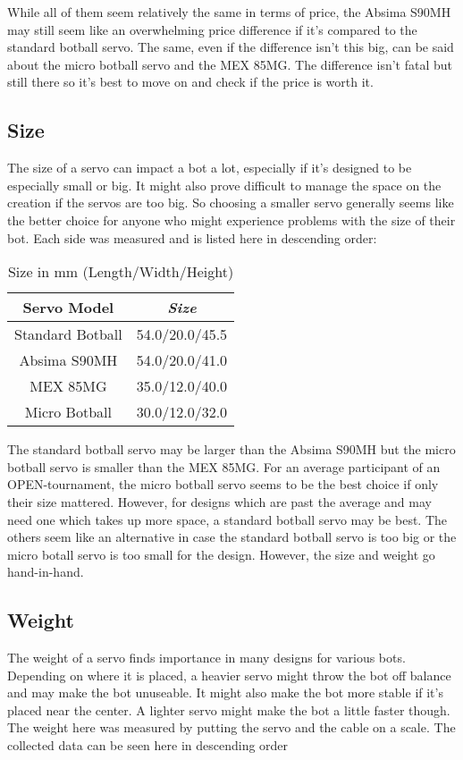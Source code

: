 \documentclass[conference]{IEEEtran}
\begin{document}
While all of them seem relatively the same in terms of price, the Absima S90MH may still seem like an overwhelming price difference if it's compared to the standard botball servo. The same, even if the difference isn't this big, can be said about the micro botball servo and the MEX 85MG. The difference isn't fatal but still there so it's best to move on and check if the price is worth it.

\subsection{Size}
The size of a servo can impact a bot a lot, especially if it's designed to be especially small or big. It might also prove difficult to manage the space on the creation if the servos are too big. So choosing a smaller servo generally seems like the better choice for anyone who might experience problems with the size of their bot. Each side was measured and is listed here in descending order:

\begin{table}[htbp]
\caption{Size in mm (Length/Width/Height)}
\begin{center}
\begin{tabular}{|c|c|}
\hline
\textbf{Servo Model} & \textbf{\textit{Size}} \\
\hline
Standard Botball & 54.0/20.0/45.5 \\
Absima S90MH & 54.0/20.0/41.0 \\
MEX 85MG & 35.0/12.0/40.0 \\
Micro Botball & 30.0/12.0/32.0 \\
\hline
\end{tabular}
\label{tab2}
\end{center}
\end{table}

The standard botball servo may be larger than the Absima S90MH but the micro botball servo is smaller than the MEX 85MG. For an average participant of an OPEN-tournament, the micro botball servo seems to be the best choice if only their size mattered. However, for designs which are past the average and may need one which takes up more space, a standard botball servo may be best. The others seem like an alternative in case the standard botball servo is too big or the micro botall servo is too small for the design. However, the size and weight go hand-in-hand.

\subsection{Weight}
The weight of a servo finds importance in many designs for various bots. Depending on where it is placed, a heavier servo might throw the bot off balance and may make the bot unuseable. It might also make the bot more stable if it's placed near the center. A lighter servo might make the bot a little faster though. The weight here was measured by putting the servo and the cable on a scale. The collected data can be seen here in descending order
\end{document}
